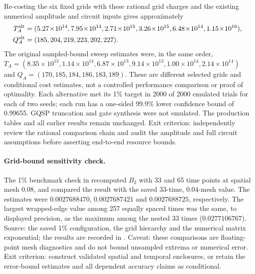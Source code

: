\documentclass[11pt,a4paper]{article}
\begin{document}
Re-costing the six fixed grids with these rational grid charges and the
existing numerical amplitude and circuit inputs gives approximately
\[
\begin{aligned}
 T_A^{\rm alt}&=(5.27\!\times\!10^{14},7.95\!\times\!10^{14},
 2.71\!\times\!10^{15},3.26\!\times\!10^{15},
 6.48\!\times\!10^{14},1.15\!\times\!10^{16}),\\
 Q_A^{\rm alt}&=(185,204,219,223,202,227).
\end{aligned}
\]
The original sampled-bound sweep estimates were, in the same order,
$T_A=(8.35\times10^{13},1.14\times10^{14},6.87\times10^{13},
9.14\times10^{13},1.00\times10^{14},2.14\times10^{14})$ and
$Q_A=(170,185,184,186,183,189)$. These are different selected grids and
conditional cost estimates, not a controlled performance comparison or
proof of optimality. Each alternative met its 1\% target in 2000 of 2000
emulated trials for each of two seeds; each run has a one-sided 99.9\% lower
confidence bound of 0.99655. GQSP truncation and gate synthesis were not
emulated. The production tables and all earlier results remain unchanged.
Exit criterion: independently review the rational comparison chain and audit
the amplitude and full circuit assumptions before asserting end-to-end
resource bounds.

\paragraph{Grid-bound sensitivity check.}
The 1\% benchmark check in  recomputed $B_2$ with
33 and 65 time points at spatial mesh $0.08$, and
compared the result with the saved 33-time, $0.04$-mesh value. The estimates
were $0.0027688470$, $0.0027687421$ and $0.0027688725$, respectively.
The largest wrapped-edge value among 257 equally spaced times was the same,
to displayed precision, as the maximum among the nested 33 times
($0.0277106767$). Source: the saved 1\% configuration, the grid hierarchy
and the numerical matrix exponential; the results are recorded in
. Caveat: these comparisons are
floating-point mesh diagnostics and do not bound unsampled extrema or numerical
error. Exit criterion: construct validated spatial and temporal enclosures,
or retain the error-bound estimates and all dependent accuracy claims as
conditional.
\end{document}
